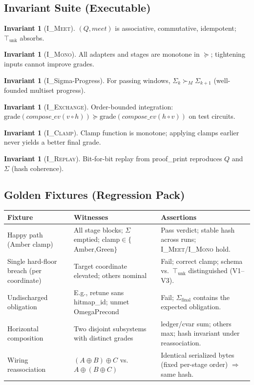 \documentclass[11pt]{article}
\theoremstyle{plain}
\theoremstyle{definition}
\newtheorem{invariant}[theorem]{Invariant}
\theoremstyle{remark}
\def\Q{Q}%
\def\Sig{\Sigma}%
\def\composeev{compose\_ev}%
\def\vmeet{meet}%
\def\code#1{#1}%
\def\ISigma{I\_Sigma-Progress}%
\DeclareRobustCommand{\Q}{\texorpdfstring{\ensuremath{\mathcal{Q}}}{Q}}     %
\DeclareRobustCommand{\Sig}{\texorpdfstring{\ensuremath{\Sigma}}{\Sigma}}   %
\DeclareMathOperator{\composeevOp}{compose\_ev}
\DeclareRobustCommand{\composeev}{\texorpdfstring{\ensuremath{\composeevOp}}{compose\_ev}}
\newcommand{\unk}{\top_{\mathrm{unk}}}         %
\newcommand{\vmeet}{\wedge}                    %
\newcommand{\geqQ}{\succeq}
\newcommand{\code}[1]{\texttt{\textup{#1}}}    %
\newcommand{\ledger}{\code{ledger}}
\newcommand{\cvar}{\code{cvar}}
\newcommand{\IMeet}{\textsc{I\_Meet}}
\newcommand{\IMono}{\textsc{I\_Mono}}
\DeclareRobustCommand{\ISigma}{%
  \texorpdfstring{\textsc{I\_\ensuremath{\Sigma}-Progress}}{\textsc{I\_Sigma-Progress}}%
}
\newcommand{\IExchange}{\textsc{I\_Exchange}}
\newcommand{\IClamp}{\textsc{I\_Clamp}}
\newcommand{\IReplay}{\textsc{I\_Replay}}
\def\Q{Q}%
\def\Sig{\Sigma}%
\def\composeev{compose\_ev}%
\def\vmeet{meet}%
\def\code#1{#1}%
\begin{document}
\subsection{Invariant Suite (Executable)}
\label{sec:invariants}
\begin{invariant}[\IMeet]
$(\Q,\vmeet)$ is associative, commutative, idempotent; $\unk$ absorbs.
\end{invariant}
\begin{invariant}[\IMono]
All adapters and stages are monotone in $\geqQ$; tightening inputs cannot improve grades.
\end{invariant}
\begin{invariant}[\ISigma]
For passing windows, $\Sigma_k \succ_M \Sigma_{k+1}$ (well-founded multiset progress).
\end{invariant}
\begin{invariant}[\IExchange]
Order-bounded integration: $\mathrm{grade}(\composeev(v\circ h)) \geqQ \mathrm{grade}(\composeev(h\circ v))$ on test circuits.
\end{invariant}
\begin{invariant}[\IClamp]
Clamp function is monotone; applying clamps earlier never yields a better final grade.
\end{invariant}
\begin{invariant}[\IReplay]
Bit-for-bit replay from \code{proof\_print} reproduces $\Q$ and $\Sig$ (hash coherence).
\end{invariant}

\subsection{Golden Fixtures (Regression Pack)}
\begin{center}
\renewcommand{\arraystretch}{1.12}
\begin{tabularx}{\linewidth}{@{}l X X@{}}
\toprule
\textbf{Fixture} & \textbf{Witnesses} & \textbf{Assertions} \\
\midrule
Happy path (Amber clamp) &
All stage blocks; $\Sig$ emptied; clamp$\in\{$Amber,Green$\}$ &
Pass verdict; stable hash across runs; \IMeet/\IMono{} hold. \\
Single hard-floor breach (per coordinate) &
Target coordinate elevated; others nominal &
Fail; correct clamp; schema vs.\ $\unk$ distinguished (V1–V3). \\
Undischarged obligation &
E.g., retune sans \code{hitmap\_id}; unmet \code{OmegaPrecond} &
Fail; $\Sigma_{\mathrm{final}}$ contains the expected obligation. \\
Horizontal composition &
Two disjoint subsystems with distinct grades &
\ledger/\cvar{} sum; others max; hash invariant under reassociation. \\
Wiring reassociation &
$(A\oplus B)\oplus C$ vs.\ $A\oplus(B\oplus C)$ &
Identical serialized bytes (fixed per-stage order) $\Rightarrow$ same hash. \\
\bottomrule
\end{tabularx}
\end{center}
\end{document}
